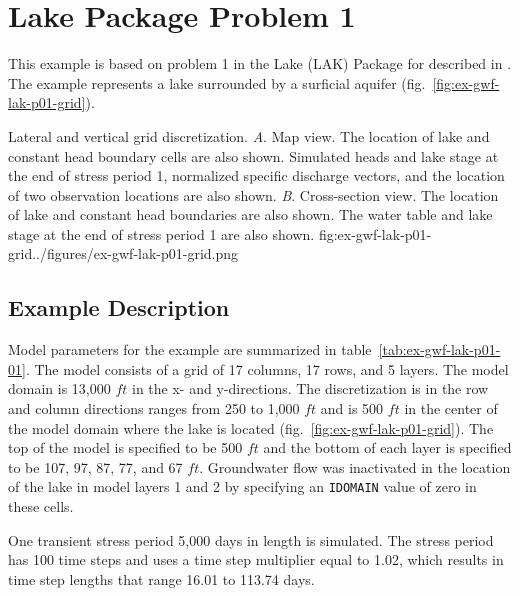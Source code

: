 \section{Lake Package Problem 1}

This example is based on problem 1 in the Lake (LAK) Package for \mftk described in \cite{modflowlak3pack}. The example represents a lake surrounded by a surficial aquifer (fig.~\ref{fig:ex-gwf-lak-p01-grid}).                                

\begin{StandardFigure}{
                                     Lateral and vertical grid discretization. 
                                     \textit{A}. Map view. The location of lake and constant head boundary
                                     cells are also shown. Simulated heads and lake stage at the end of stress 
                                     period 1, normalized specific discharge vectors, and the location of two 
                                     observation locations are also shown.
                                     \textit{B}. Cross-section view. The location of lake and constant 
                                     head boundaries are also shown. The water table and lake stage at the
                                     end of stress period 1 are also shown. 
                                     }{fig:ex-gwf-lak-p01-grid}{../figures/ex-gwf-lak-p01-grid.png}
\end{StandardFigure}   


\subsection{Example Description}
Model parameters for the example are summarized in table~\ref{tab:ex-gwf-lak-p01-01}.  The model consists of a grid of 17 columns, 17 rows, and 5 layers. The model domain is 13,000 $ft$ in the x- and y-directions. The discretization is in the row and column directions ranges from 250 to 1,000 $ft$ and is 500 $ft$ in the center of the model domain where the lake is located (fig.~\ref{fig:ex-gwf-lak-p01-grid}). The top of the model is specified to be 500 $ft$ and the bottom of each layer is specified to be 107, 97, 87, 77, and 67 $ft$. Groundwater flow was inactivated in the location of the lake in model layers 1 and 2 by specifying an \texttt{IDOMAIN} value of zero in these cells.

One transient stress period 5,000 days in length is simulated. The stress period has 100 time steps and uses a time step multiplier equal to 1.02, which results in time step lengths that range 16.01 to 113.74 days.

